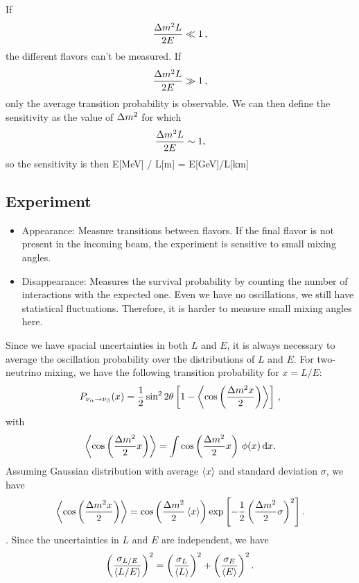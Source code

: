 \documentclass[twocolumn]{article}
\begin{document}
If 
\begin{align*}
  \frac{\dm L}{2E} \ll 1
\,,\end{align*}
the different flavors can't be measured.
If 
\begin{align*}
  \frac{\dm L}{2E} \gg 1
\,,\end{align*}
only the average transition probability is observable. We can then define the sensitivity as the value of $\dm$ for which 
\begin{align*}
  \frac{\dm L}{2E} \sim 1
,\end{align*}
so the sensitivity is then E[MeV] / L[m] = E[GeV]/L[km]
\subsection*{Experiment}
\begin{itemize}
  \item Appearance: Measure transitions between flavors. If the final flavor is not present in the incoming beam, the experiment is sensitive to small mixing angles.
  \item Disappearance: Measures the survival probability by counting the number of interactions with the expected one. Even we have no oscillations, we still have statistical fluctuations. Therefore, it is harder to measure small mixing angles here.
\end{itemize}

Since we have spacial uncertainties in both $L$ and $E$, it is always necessary to average the oscillation probability over the distributions of $L$ and $E$. For two-neutrino mixing, we have the following transition probability for $x = L / E$:
\begin{align*}
  P_{\nu_\alpha \to \nu_\beta}(x) = \frac{1}{2} \sin^2 2\theta \left[1 - \left\langle \cos \left( \frac{\Delta m^2 x}{2} \right) \right\rangle \right]
\,,\end{align*}
with
\begin{align*}
  \left \langle \cos \left (\frac{\dm}{2} x \right) \right \rangle = \int \cos \left (\frac{\dm}{2} x \right ) \, \phi(x) \, \dd x
.\end{align*}
Assuming Gaussian distribution with average $\left\langle {x} \right \rangle$ and standard deviation $\sigma$, we have 
\begin{align*}
  \avg{\cos\left( \frac{\dm x}{2} \right)} = \cos\left( \frac{\dm}{2} \avg{x}\right)\exp\left[-\frac{1}{2} \left(\frac{\dm}{2}\sigma\right)^2\right]
.\end{align*}.
Since the uncertainties in $L$ and $E$ are independent, we have
\begin{align*}
  \left(\frac{\sigma_{L/E}}{\left\langle {L/E} \right \rangle}\right)^2 = \left(\frac{\sigma_L}{\left\langle {L} \right \rangle}\right)^2 + \left(\frac{\sigma_E}{\left\langle {E} \right \rangle}\right)^2 
.\end{align*}
\end{document}
